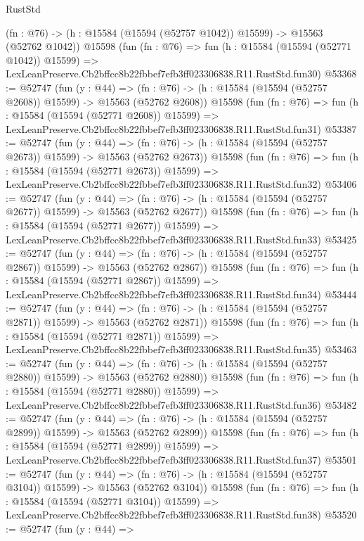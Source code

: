 \begin{lexlean}{RustStd}
\begin{coremodule}
    (fn : @76) -> (h : @15584 (@15594 (@52757 @1042)) @15599) -> @15563 (@52762 @1042))
    @15598
    (fun (fn : @76) =>
    fun (h : @15584 (@15594 (@52771 @1042)) @15599) =>
    LexLeanPreserve.Cb2bffcc8b22fbbef7efb3ff023306838.R11.RustStd.fun30)
@53368 := @52747
    (fun (y : @44) =>
    (fn : @76) -> (h : @15584 (@15594 (@52757 @2608)) @15599) -> @15563 (@52762 @2608))
    @15598
    (fun (fn : @76) =>
    fun (h : @15584 (@15594 (@52771 @2608)) @15599) =>
    LexLeanPreserve.Cb2bffcc8b22fbbef7efb3ff023306838.R11.RustStd.fun31)
@53387 := @52747
    (fun (y : @44) =>
    (fn : @76) -> (h : @15584 (@15594 (@52757 @2673)) @15599) -> @15563 (@52762 @2673))
    @15598
    (fun (fn : @76) =>
    fun (h : @15584 (@15594 (@52771 @2673)) @15599) =>
    LexLeanPreserve.Cb2bffcc8b22fbbef7efb3ff023306838.R11.RustStd.fun32)
@53406 := @52747
    (fun (y : @44) =>
    (fn : @76) -> (h : @15584 (@15594 (@52757 @2677)) @15599) -> @15563 (@52762 @2677))
    @15598
    (fun (fn : @76) =>
    fun (h : @15584 (@15594 (@52771 @2677)) @15599) =>
    LexLeanPreserve.Cb2bffcc8b22fbbef7efb3ff023306838.R11.RustStd.fun33)
@53425 := @52747
    (fun (y : @44) =>
    (fn : @76) -> (h : @15584 (@15594 (@52757 @2867)) @15599) -> @15563 (@52762 @2867))
    @15598
    (fun (fn : @76) =>
    fun (h : @15584 (@15594 (@52771 @2867)) @15599) =>
    LexLeanPreserve.Cb2bffcc8b22fbbef7efb3ff023306838.R11.RustStd.fun34)
@53444 := @52747
    (fun (y : @44) =>
    (fn : @76) -> (h : @15584 (@15594 (@52757 @2871)) @15599) -> @15563 (@52762 @2871))
    @15598
    (fun (fn : @76) =>
    fun (h : @15584 (@15594 (@52771 @2871)) @15599) =>
    LexLeanPreserve.Cb2bffcc8b22fbbef7efb3ff023306838.R11.RustStd.fun35)
@53463 := @52747
    (fun (y : @44) =>
    (fn : @76) -> (h : @15584 (@15594 (@52757 @2880)) @15599) -> @15563 (@52762 @2880))
    @15598
    (fun (fn : @76) =>
    fun (h : @15584 (@15594 (@52771 @2880)) @15599) =>
    LexLeanPreserve.Cb2bffcc8b22fbbef7efb3ff023306838.R11.RustStd.fun36)
@53482 := @52747
    (fun (y : @44) =>
    (fn : @76) -> (h : @15584 (@15594 (@52757 @2899)) @15599) -> @15563 (@52762 @2899))
    @15598
    (fun (fn : @76) =>
    fun (h : @15584 (@15594 (@52771 @2899)) @15599) =>
    LexLeanPreserve.Cb2bffcc8b22fbbef7efb3ff023306838.R11.RustStd.fun37)
@53501 := @52747
    (fun (y : @44) =>
    (fn : @76) -> (h : @15584 (@15594 (@52757 @3104)) @15599) -> @15563 (@52762 @3104))
    @15598
    (fun (fn : @76) =>
    fun (h : @15584 (@15594 (@52771 @3104)) @15599) =>
    LexLeanPreserve.Cb2bffcc8b22fbbef7efb3ff023306838.R11.RustStd.fun38)
@53520 := @52747
    (fun (y : @44) =>

\end{coremodule}
\end{lexlean}
